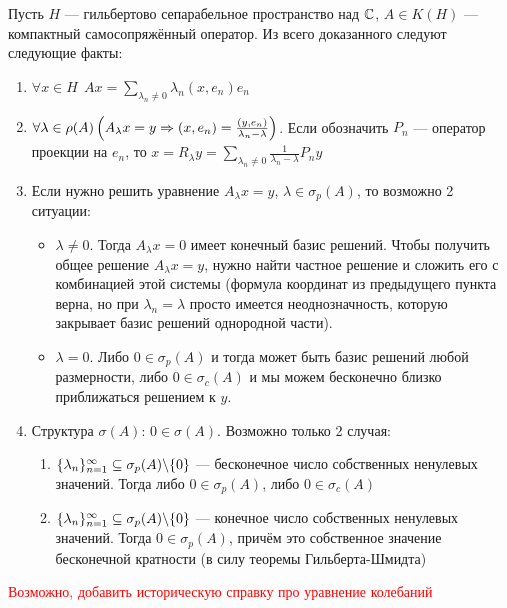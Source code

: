 \begin{note}
	Пусть $H$ --- гильбертово сепарабельное пространство над $\mathbb{C}$, $A \in K(H)$ --- компактный самосопряжённый оператор. Из всего доказанного следуют следующие факты:
	\begin{enumerate}
		\item $\forall x \in H\ \ Ax = \sum_{\lambda_n \neq 0} \lambda_n(x, e_n)e_n$
		
		\item $\forall \lambda \in \rho(A) \left(A_\lambda x = y \Rightarrow (x, e_n) = \frac{(y, e_n)}{\lambda_n - \lambda}\right)$. Если обозначить $P_n$ --- оператор проекции на $e_n$, то $x = R_\lambda y = \sum_{\lambda_n \neq 0} \frac{1}{\lambda_n - \lambda} P_ny$
		
		\item Если нужно решить уравнение $A_\lambda x = y$, $\lambda \in \sigma_p(A)$, то возможно 2 ситуации:
		\begin{itemize}
			\item $\lambda \neq 0$. Тогда $A_\lambda x = 0$ имеет конечный базис решений. Чтобы получить общее решение $A_\lambda x = y$, нужно найти частное решение и сложить его с комбинацией этой системы (формула координат из предыдущего пункта верна, но при $\lambda_n = \lambda$ просто имеется неоднозначность, которую закрывает базис решений однородной части).
			
			\item $\lambda = 0$. Либо $0 \in \sigma_p(A)$ и тогда может быть базис решений любой размерности, либо $0 \in \sigma_c(A)$ и мы можем бесконечно близко приближаться решением к $y$.
		\end{itemize}
		
		\item Структура $\sigma(A)$: $0 \in \sigma(A)$. Возможно только 2 случая:
		\begin{enumerate}
			\item $\{\lambda_n\}_{n = 1}^\infty \subseteq \sigma_p(A) \backslash \{0\}$ --- бесконечное число собственных ненулевых значений. Тогда либо $0 \in \sigma_p(A)$, либо $0 \in \sigma_c(A)$
			
			\item $\{\lambda_n\}_{n = 1}^\infty \subseteq \sigma_p(A) \backslash \{0\}$ --- конечное число собственных ненулевых значений. Тогда $0 \in \sigma_p(A)$, причём это собственное значение бесконечной кратности (в силу теоремы Гильберта-Шмидта)
		\end{enumerate}
	\end{enumerate}
\end{note}

\textcolor{red}{Возможно, добавить историческую справку про уравнение колебаний}